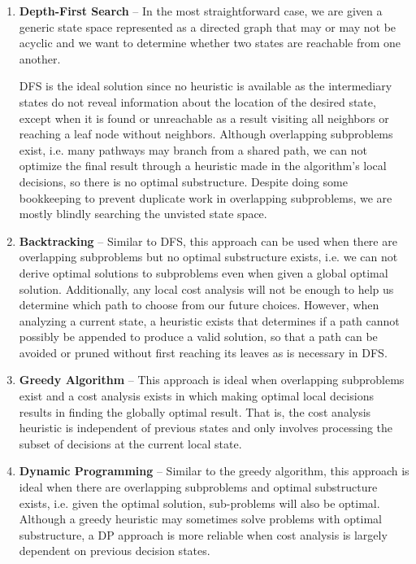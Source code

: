 \documentclass{article}
\begin{document}
    \begin{enumerate}
        \item \textbf{Depth-First Search} --
        In the most straightforward case, we are given a generic state space represented as a directed graph that may or may not be acyclic and we want to determine  whether two states are reachable from one another. 
        
        DFS is the ideal solution since no heuristic is available as the intermediary states do not reveal information about the location of the desired state, except when it is found or unreachable as a result visiting all neighbors or reaching a leaf node without neighbors. Although overlapping subproblems exist, i.e. many pathways may branch from a shared path, we can not optimize the final result through a heuristic made in the algorithm's local decisions, so there is no optimal substructure. Despite doing some bookkeeping to prevent duplicate work in overlapping subproblems, we are mostly blindly searching the unvisted state space.
        
        \item \textbf{Backtracking} -- Similar to DFS, this approach can be used when there are overlapping subproblems but no optimal substructure exists, i.e. we can not derive optimal solutions to subproblems even when given a global optimal solution. Additionally, any local cost analysis will not be enough to help us determine which path to choose from our future choices. However, when analyzing a current state, a heuristic exists that determines if a path cannot possibly be appended to produce a valid solution, so that a path can be avoided or pruned without first reaching its leaves as is necessary in DFS.
        
        \item \textbf{Greedy Algorithm} -- This approach is ideal when overlapping subproblems exist and a cost analysis exists in which making optimal local decisions results in finding the globally optimal result. That is, the cost analysis heuristic is independent of previous states and only involves processing the subset of decisions at the current local state.

        \item \textbf{Dynamic Programming} --  Similar to the greedy algorithm, this approach is ideal when there are overlapping subproblems and optimal substructure exists, i.e. given the optimal solution, sub-problems will also be optimal. Although a greedy heuristic may sometimes solve problems with optimal substructure, a DP approach is more reliable when cost analysis is largely dependent on previous decision states.
    \end{enumerate}
    
\end{document}
